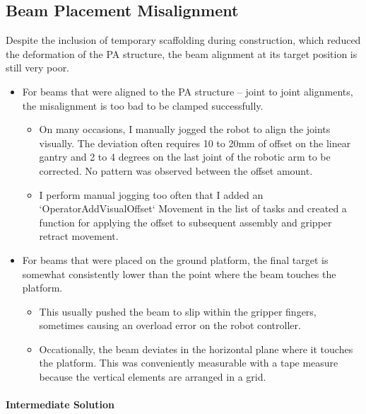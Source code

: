 \subsection{Beam Placement Misalignment}
\label{subsection:exploration-3-beam-placement-misalignment}

Despite the inclusion of temporary scaffolding during construction, which reduced the deformation of the PA structure, the beam alignment at its target position is still very poor.

\begin{itemize}
	\item For beams that were aligned to the PA structure -- joint to joint alignments, the misalignment is too bad to be clamped successfully. 

    \begin{itemize}
        \item On many occasions, I manually jogged the robot to align the joints visually. The deviation often requires 10 to 20mm of offset on the linear gantry and 2 to 4 degrees on the last joint of the robotic arm to be corrected. No pattern was observed between the offset amount.

        \item I perform manual jogging too often that I added an `OperatorAddVisualOffset` Movement in the list of tasks and created a function for applying the offset to subsequent assembly and gripper retract movement.

    \end{itemize}

	\item For beams that were placed on the ground platform, the final target is somewhat consistently lower than the point where the beam touches the platform.
    \begin{itemize}
        \item This usually pushed the beam to slip within the gripper fingers, sometimes causing an overload error on the robot controller.

        \item Occationally, the beam deviates in the horizontal plane where it touches the platform. This was conveniently measurable with a tape measure because the vertical elements are arranged in a grid.
    \end{itemize}
\end{itemize}

\paragraph{Intermediate Solution}

